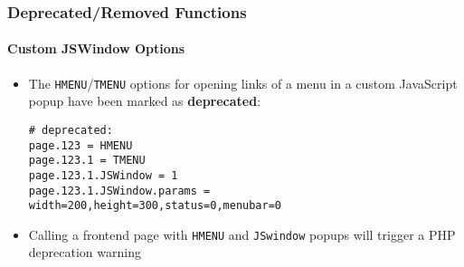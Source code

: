 %

\begin{frame}[fragile]
	\frametitle{Deprecated/Removed Functions}
	\framesubtitle{Custom JSWindow Options}


	\begin{itemize}
		\item The \texttt{HMENU}/\texttt{TMENU} options for opening links of a
			menu in a custom JavaScript popup have been marked as \textbf{deprecated}:
\begin{lstlisting}
# deprecated:
page.123 = HMENU
page.123.1 = TMENU
page.123.1.JSWindow = 1
page.123.1.JSWindow.params = width=200,height=300,status=0,menubar=0
\end{lstlisting}
		\item Calling a frontend page with \texttt{HMENU} and \texttt{JSwindow}
			popups will trigger a PHP deprecation warning
	\end{itemize}

\end{frame}

